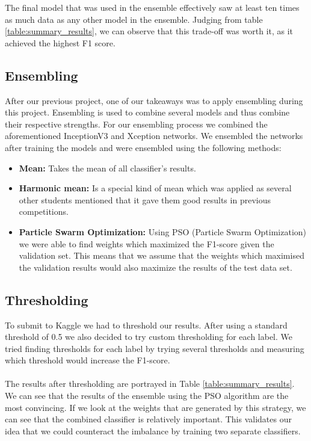 \documentclass[twocolumn]{article}
\begin{document}
        The final model that was used in the ensemble effectively saw at least ten times as much data as any other model in the ensemble. Judging from table \ref{table:summary_results}, we can observe that this trade-off was worth it, as it achieved the highest F1 score.
        
		\subsection{Ensembling}
		After our previous project, one of our takeaways was to apply ensembling during this project. Ensembling is used to combine several models and thus combine their respective strengths. For our ensembling process we combined the aforementioned InceptionV3 and Xception networks. We ensembled the networks after training the models and were ensembled using the following methods:
		\begin{itemize}
		    \item \textbf{Mean:} Takes the mean of all classifier's results.
		    \item \textbf{Harmonic mean:} Is a special kind of mean which was applied as several other students mentioned that it gave them good results in previous competitions. 
		    \item \textbf{Particle Swarm Optimization:} Using PSO (Particle Swarm Optimization) we were able to find weights which maximized the F1-score given the validation set. This means that we assume that the weights which maximised the validation results would also maximize the results of the test data set. 
		\end{itemize}

		\subsection{Thresholding}
		To submit to Kaggle we had to threshold our results. After using a standard threshold of 0.5 we also decided to try custom thresholding for each label. We tried finding thresholds for each label by trying several thresholds and measuring which threshold would increase the F1-score.
\\
\\
		The results after thresholding are portrayed in Table \ref{table:summary_results}. We can see that the results of the ensemble using the PSO algorithm are the most convincing. If we look at the weights that are generated by this strategy, we can see that the combined classifier is relatively important. This validates our idea that we could counteract the imbalance by training two separate classifiers.
\end{document}
